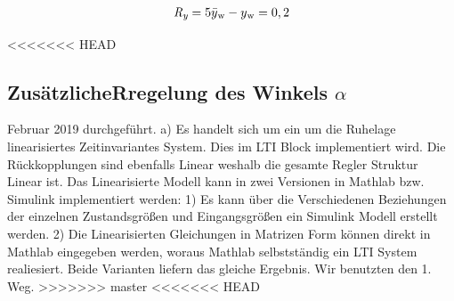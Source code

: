 \documentclass[10pt]{scrartcl}
\begin{document}
\begin{align}
\textit{R\textsubscript{y}} = 5 \bar{y}\textsubscript{w}-y\textsubscript{w} = 0,2 
\end{align}









\newpage
<<<<<<< HEAD
\subsection{ZusätzlicheRregelung des Winkels $\alpha$ }
Februar 2019 durchgeführt.
a)	Es handelt sich um ein um die Ruhelage linearisiertes Zeitinvariantes System. Dies im LTI Block implementiert wird. Die Rückkopplungen sind ebenfalls Linear weshalb die gesamte Regler Struktur Linear ist.
Das Linearisierte Modell kann in zwei Versionen in Mathlab bzw. Simulink implementiert werden:
1) Es kann über die Verschiedenen Beziehungen der einzelnen Zustandsgrößen und Eingangsgrößen ein Simulink Modell erstellt werden.
2) Die Linearisierten Gleichungen in Matrizen Form können direkt in Mathlab eingegeben werden, woraus Mathlab selbstständig ein LTI System realiesiert. 
Beide Varianten liefern das gleiche Ergebnis.
Wir benutzten den 1. Weg. 
>>>>>>> master
<<<<<<< HEAD
\end{document}
